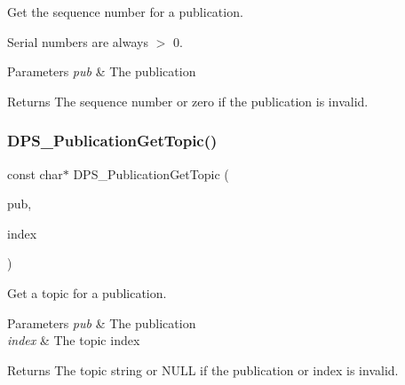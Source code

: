 Get the sequence number for a publication. 

Serial numbers are always $>$ 0.


\begin{DoxyParams}{Parameters}
{\em pub} & The publication\\
\hline
\end{DoxyParams}
\begin{DoxyReturn}{Returns}
The sequence number or zero if the publication is invalid. 
\end{DoxyReturn}
\mbox{\label{group__publication_ga143a5c6fbe0bdf1725e841f122582432}} 
\subsubsection{\texorpdfstring{D\+P\+S\+\_\+\+Publication\+Get\+Topic()}{DPS\_PublicationGetTopic()}}
{\footnotesize\ttfamily const char$\ast$ D\+P\+S\+\_\+\+Publication\+Get\+Topic (\begin{DoxyParamCaption}\item[{const \hyperlink{group__publication_ga0d439693474aa54e27f3d45a054696ac}{D\+P\+S\+\_\+\+Publication} $\ast$}]{pub,  }\item[{size\+\_\+t}]{index }\end{DoxyParamCaption})}



Get a topic for a publication. 


\begin{DoxyParams}{Parameters}
{\em pub} & The publication \\
\hline
{\em index} & The topic index\\
\hline
\end{DoxyParams}
\begin{DoxyReturn}{Returns}
The topic string or N\+U\+LL if the publication or index is invalid. 
\end{DoxyReturn}
\mbox{\label{group__publication_gaba1ad3ee807b75a1281d334be06a12f7}} 
